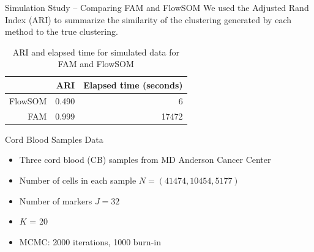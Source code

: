 \documentclass[ignorenonframetext,]{beamer}
\begin{document}
\begin{frame}{Simulation Study -- Comparing FAM and FlowSOM}
We used the Adjusted Rand Index (ARI) to summarize the similarity of the
clustering generated by each method to the true clustering. 

\begin{table}
\begin{center}
\begin{tabular}{rrr}
  \hline
 & ARI & Elapsed time (seconds) \\ 
  \hline
  FlowSOM & 0.490 & 6 \\ 
  FAM & 0.999 & 17472 \\ 
   \hline
\end{tabular}
\end{center}
\caption{ARI and elapsed time for simulated data for FAM and FlowSOM}
\end{table}
\end{frame}


\begin{frame}{Cord Blood Samples Data}
  \begin{itemize}
    \setlength\itemsep{1em}
    \item Three cord blood (CB) samples from MD Anderson Cancer Center
    \item Number of cells in each sample $N = (41474,10454,5177)$
    \item Number of markers $J=32$
    \item $K$ = 20
    \item MCMC: 2000 iterations, 1000 burn-in
  \end{itemize}
\end{frame}
\end{document}
